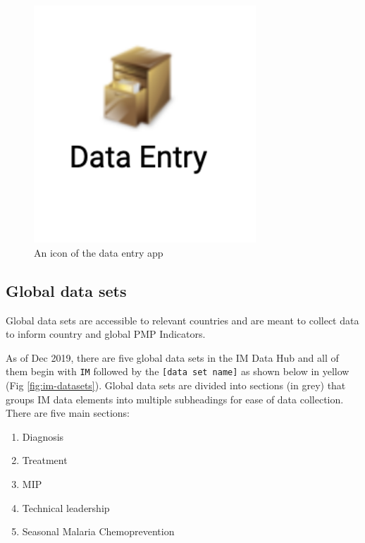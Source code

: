 \documentclass[]{book}
\providecommand{\tightlist}{%
  \setlength{\itemsep}{0pt}\setlength{\parskip}{0pt}}
\begin{document}
\begin{figure}
\includegraphics[width=3.28in]{./images/data-entry-app} \caption{An icon of the data entry app}\label{fig:data-entry-app}
\end{figure}

\hypertarget{global-dataset}{%
\subsection{Global data sets}\label{global-dataset}}

Global data sets are accessible to relevant countries and are meant to collect data to inform country and global PMP Indicators.

As of Dec 2019, there are five global data sets in the IM Data Hub and all of them begin with \texttt{IM} followed by the \texttt{{[}data\ set\ name{]}} as shown below in yellow (Fig \ref{fig:im-datasets}). Global data sets are divided into sections (in grey) that groups IM data elements into multiple subheadings for ease of data collection. There are five main sections:

\begin{enumerate}
\def\labelenumi{\arabic{enumi}.}
\tightlist
\item
  Diagnosis
\item
  Treatment
\item
  MIP
\item
  Technical leadership
\item
  Seasonal Malaria Chemoprevention
\end{enumerate}
\end{document}
